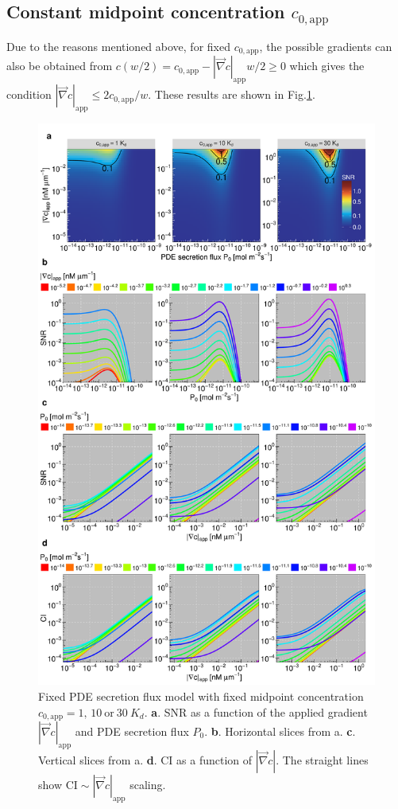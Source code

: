 \documentclass[10pt]{article}
\begin{document}
\subsection{Constant midpoint concentration $c_{0, \mathrm{app}}$}

Due to the reasons mentioned above, for fixed $c_{0, \mathrm{app}}$, the possible gradients can also be obtained from $c(w/2) = c_{0,\mathrm{app}} - |\vec{\nabla}c|_{\mathrm{app}}w/2 \geq 0$ which gives the condition $|\vec{\nabla}c|_{\mathrm{app}} \leq 2c_{0,\mathrm{app}}/w$. These results are shown in Fig.\ref{sifig:fixed_c0}.

\begin{figure}[!ht]
	\centering
	\includegraphics[scale=0.25]{../figures/si_pde_flux_fixed_c0_snr_plots}
	\caption{
	Fixed PDE secretion flux model with fixed midpoint concentration $c_{0,\mathrm{app}} = 1,\,10\:\mathrm{or}\:30\:K_d$. 		
	\textbf{a}. SNR as a function of the applied gradient $|\vec{\nabla}c|_{\mathrm{app}}$ and PDE secretion flux $P_0$.
	\textbf{b}. Horizontal slices from a.
	\textbf{c}. Vertical slices from a.
	\textbf{d}. CI as a function of $|\vec{\nabla}c|$. The straight lines show $\mathrm{CI} \sim |\vec{\nabla}c|_{\mathrm{app}}$ scaling.
	}
	\label{sifig:fixed_c0}
\end{figure}
\end{document}
